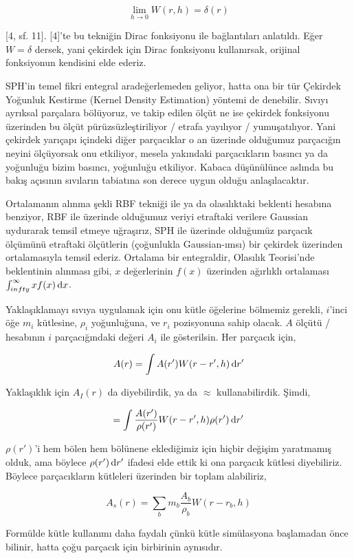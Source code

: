 \documentclass[12pt,fleqn]{article}\usepackage{../../common}
\begin{document}
$$
\lim_{h \to 0} W(r,h) = \delta(r)
$$

[4, sf. 11]. [4]'te bu tekniğin Dirac fonksiyonu ile bağlantıları
anlatıldı. Eğer $W = \delta$ dersek, yani çekirdek için Dirac fonksiyonu
kullanırsak, orijinal fonksiyonun kendisini elde ederiz.

SPH'in temel fikri entegral aradeğerlemeden geliyor, hatta ona bir tür Çekirdek
Yoğunluk Kestirme (Kernel Density Estimation) yöntemi de denebilir. Sıvıyı
ayrıksal parçalara bölüyoruz, ve takip edilen ölçüt ne ise çekirdek fonksiyonu
üzerinden bu ölçüt pürüzsüzleştiriliyor / etrafa yayılıyor / yumuşatılıyor. Yani
çekirdek yarıçapı içindeki diğer parçacıklar o an üzerinde olduğumuz parçacığın
neyini ölçüyorsak onu etkiliyor, mesela yakındaki parçacıkların basıncı ya da
yoğunluğu bizim basıncı, yoğunluğu etkiliyor. Kabaca düşünülünce aslında bu
bakış açısının sıvıların tabiatına son derece uygun olduğu anlaşılacaktır.

Ortalamanın alınma şekli RBF tekniği ile ya da olasılıktaki beklenti hesabına
benziyor, RBF ile üzerinde olduğumuz veriyi etraftaki verilere Gaussian
uydurarak temsil etmeye uğraşırız, SPH ile üzerinde olduğumüz parçacık ölçümünü
etraftaki ölçütlerin (çoğunlukla Gaussian-ımsı) bir çekirdek üzerinden
ortalamasıyla temsil ederiz. Ortalama bir entegraldir, Olasılık Teorisi'nde
beklentinin alınması gibi, $x$ değerlerinin $f(x)$ üzerinden ağırlıklı
ortalaması $\int_{\-infty}^{\infty} x f(x) \,\mathrm{d} x$.

Yaklaşıklamayı sıvıya uygulamak için onu kütle öğelerine bölmemiz gerekli,
$i$'inci öğe $m_i$ kütlesine, $\rho_i$ yoğunluğuna, ve $r_i$ pozisyonuna sahip
olacak. $A$ ölçütü / hesabının $i$ parçacığındaki değeri $A_i$ ile
gösterilsin. Her parçacık için,

$$
A(r) = \int A(r') W(r-r',h) \,\mathrm{d} r'
$$

Yaklaşıklık için $A_I(r)$ da diyebilirdik, ya da $\approx$
kullanabilirdik. Şimdi,

$$
 = \int \frac{A(r')}{\rho(r')} W(r-r',h) \rho(r') \,\mathrm{d} r'
$$

$\rho(r')$'i hem bölen hem bölünene eklediğimiz için hiçbir değişim yaratmamış
olduk, ama böylece $\rho(r') \,\mathrm{d} r'$ ifadesi elde ettik ki ona parçacık kütlesi
diyebiliriz. Böylece parçacıkların kütleleri üzerinden bir toplam alabiliriz,

$$
A_s(r) = \sum_b m_b \frac{A_b}{\rho_b} W(r-r_b, h)
$$

Formülde kütle kullanımı daha faydalı çünkü kütle simülasyona başlamadan önce
bilinir, hatta çoğu parçacık için birbirinin aynısıdır. 
\end{document}
